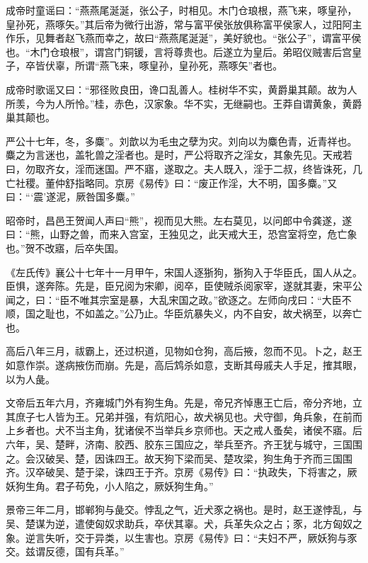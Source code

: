 \documentclass[12pt,UTF8]{ctexbook}
\begin{document}
成帝时童谣曰：“燕燕尾涎涎，张公子，时相见。木门仓琅根，燕飞来，啄皇孙，皇孙死，燕啄矢。”其后帝为微行出游，常与富平侯张放俱称富平侯家人，过阳阿主作乐，见舞者赵飞燕而幸之，故曰“燕燕尾涎涎”，美好貌也。“张公子”，谓富平侯也。“木门仓琅根”，谓宫门铜锾，言将尊贵也。后遂立为皇后。弟昭仪贼害后宫皇子，卒皆伏辜，所谓“燕飞来，啄皇孙，皇孙死，燕啄矢”者也。



成帝时歌谣又曰：“邪径败良田，谗口乱善人。桂树华不实，黄爵巢其颠。故为人所羡，今为人所怜。”桂，赤色，汉家象。华不实，无继嗣也。王莽自谓黄象，黄爵巢其颠也。



严公十七年，冬，多麋”。刘歆以为毛虫之孽为灾。刘向以为麋色青，近青祥也。麋之为言迷也，盖牝兽之淫者也。是时，严公将取齐之淫女，其象先见。天戒若曰，勿取齐女，淫而迷国。严不寤，遂取之。夫人既入，淫于二叔，终皆诛死，几亡社稷。董仲舒指略同。京房《易传》曰：“废正作淫，大不明，国多麋。”又曰：“‘震’遂泥，厥咎国多麋。”



昭帝时，昌邑王贺闻人声曰“熊”，视而见大熊。左右莫见，以问郎中令龚遂，遂曰：“熊，山野之兽，而来入宫室，王独见之，此天戒大王，恐宫室将空，危亡象也。”贺不改寤，后卒失国。



《左氏传》襄公十七年十一月甲午，宋国人逐狾狗，狾狗入于华臣氏，国人从之。臣惧，遂奔陈。先是，臣兄阅为宋卿，阅卒，臣使贼杀阅家宰，遂就其妻，宋平公闻之，曰：“臣不唯其宗室是暴，大乱宋国之政。”欲逐之。左师向戌曰：“大臣不顺，国之耻也，不如盖之。”公乃止。华臣炕暴失义，内不自安，故犬祸至，以奔亡也。



高后八年三月，祓霸上，还过枳道，见物如仓狗，高后掖，忽而不见。卜之，赵王如意作崇。遂病掖伤而崩。先是，高后鸩杀如意，支断其母戚夫人手足，搉其眼，以为人彘。



文帝后五年六月，齐雍城门外有狗生角。先是，帝兄齐悼惠王亡后，帝分齐地，立其庶子七人皆为王。兄弟并强，有炕阳心，故犬祸见也。犬守御，角兵象，在前而上乡者也。犬不当主角，犹诸侯不当举兵乡京师也。天之戒人蚤矣，诸侯不寤。后六年，吴、楚畔，济南、胶西、胶东三国应之，举兵至齐。齐王犹与城守，三国围之。会汉破吴、楚，因诛四王。故天狗下梁而吴、楚攻梁，狗生角于齐而三国围齐。汉卒破吴、楚于梁，诛四王于齐。京房《易传》曰：“执政失，下将害之，厥妖狗生角。君子苟免，小人陷之，厥妖狗生角。”



景帝三年二月，邯郸狗与彘交。悖乱之气，近犬豕之祸也。是时，赵王遂悖乱，与吴、楚谋为逆，遣使匈奴求助兵，卒伏其辜。犬，兵革失众之占；豕，北方匈奴之象。逆言失听，交于异类，以生害也。京房《易传》曰：“夫妇不严，厥妖狗与豕交。兹谓反德，国有兵革。”
\end{document}
